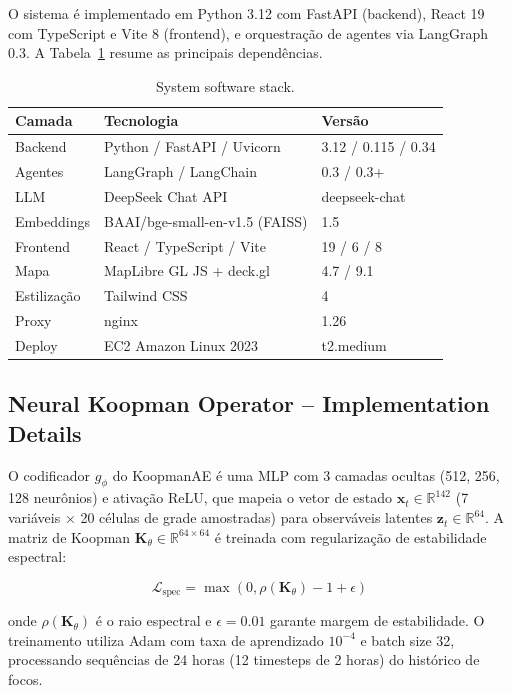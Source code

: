 \documentclass[preprint,times,numbers]{elsarticle}
\begin{document}
O sistema é implementado em Python 3.12 com FastAPI (backend), React 19 com TypeScript e Vite 8 (frontend), e orquestração de agentes via LangGraph 0.3. A Tabela~\ref{tab:software-stack} resume as principais dependências.

\begin{table}[htbp]
\centering
\caption{System software stack.}
\label{tab:software-stack}
\small
\begin{tabular}{@{}lll@{}}
\toprule
\textbf{Camada} & \textbf{Tecnologia} & \textbf{Versão} \\
\midrule
Backend & Python / FastAPI / Uvicorn & 3.12 / 0.115 / 0.34 \\
Agentes & LangGraph / LangChain & 0.3 / 0.3+ \\
LLM & DeepSeek Chat API & deepseek-chat \\
Embeddings & BAAI/bge-small-en-v1.5 (FAISS) & 1.5 \\
Frontend & React / TypeScript / Vite & 19 / 6 / 8 \\
Mapa & MapLibre GL JS + deck.gl & 4.7 / 9.1 \\
Estilização & Tailwind CSS & 4 \\
Proxy & nginx & 1.26 \\
Deploy & EC2 Amazon Linux 2023 & t2.medium \\
\bottomrule
\end{tabular}
\end{table}

\subsection{Neural Koopman Operator -- Implementation Details}
\label{sec:koopman-impl}

O codificador $g_\phi$ do KoopmanAE é uma MLP com 3 camadas ocultas (512, 256, 128 neurônios) e ativação ReLU, que mapeia o vetor de estado $\mathbf{x}_t \in \mathbb{R}^{142}$ (7 variáveis $\times$ 20 células de grade amostradas) para observáveis latentes $\mathbf{z}_t \in \mathbb{R}^{64}$. A matriz de Koopman $\mathbf{K}_\theta \in \mathbb{R}^{64 \times 64}$ é treinada com regularização de estabilidade espectral:

\begin{equation}
\mathcal{L}_{\text{spec}} = \max(0, \rho(\mathbf{K}_\theta) - 1 + \epsilon)
\label{eq:spectral_reg}
\end{equation}

onde $\rho(\mathbf{K}_\theta)$ é o raio espectral e $\epsilon = 0.01$ garante margem de estabilidade. O treinamento utiliza Adam com taxa de aprendizado $10^{-4}$ e batch size 32, processando sequências de 24 horas (12 timesteps de 2 horas) do histórico de focos.
\end{document}
